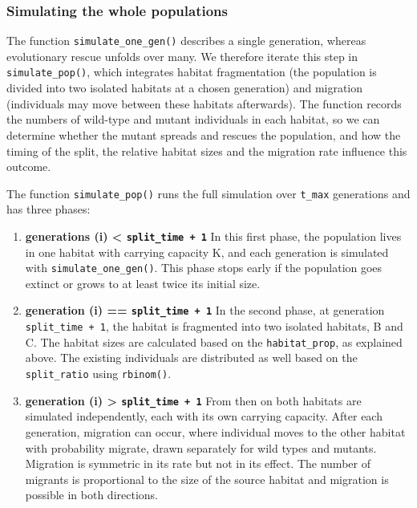 \documentclass[
]{article}
\begin{document}
\subsubsection{Simulating the whole
populations}\label{simulating-the-whole-populations}

The function \texttt{simulate\_one\_gen()} describes a single
generation, whereas evolutionary rescue unfolds over many. We therefore
iterate this step in \texttt{simulate\_pop()}, which integrates habitat
fragmentation (the population is divided into two isolated habitats at a
chosen generation) and migration (individuals may move between these
habitats afterwards). The function records the numbers of wild-type and
mutant individuals in each habitat, so we can determine whether the
mutant spreads and rescues the population, and how the timing of the
split, the relative habitat sizes and the migration rate influence this
outcome.

The function \texttt{simulate\_pop()} runs the full simulation over
\texttt{t\_max} generations and has three phases:

\begin{enumerate}
\def\labelenumi{\arabic{enumi}.}
\item
  \textbf{generations (i) \textless{} \texttt{split\_time\ +\ 1}} In
  this first phase, the population lives in one habitat with carrying
  capacity K, and each generation is simulated with
  \texttt{simulate\_one\_gen()}. This phase stops early if the
  population goes extinct or grows to at least twice its initial size.
\item
  \textbf{generation (i) == \texttt{split\_time\ +\ 1}} In the second
  phase, at generation \texttt{split\_time\ +\ 1}, the habitat is
  fragmented into two isolated habitats, B and C. The habitat sizes are
  calculated based on the \texttt{habitat\_prop}, as explained above.
  The existing individuals are distributed as well based on the
  \texttt{split\_ratio} using \texttt{rbinom()}.
\item
  \textbf{generation (i) \textgreater{} \texttt{split\_time\ +\ 1}} From
  then on both habitats are simulated independently, each with its own
  carrying capacity. After each generation, migration can occur, where
  individual moves to the other habitat with probability migrate, drawn
  separately for wild types and mutants. Migration is symmetric in its
  rate but not in its effect. The number of migrants is proportional to
  the size of the source habitat and migration is possible in both
  directions.
\end{enumerate}
\end{document}

